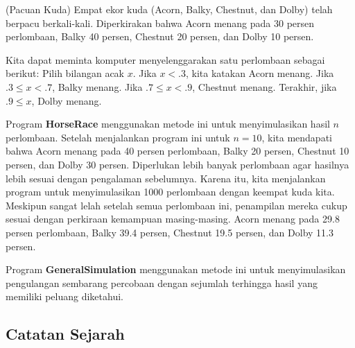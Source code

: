 \begin{example}(Pacuan Kuda)\label{exam 1.4}
Empat ekor kuda (Acorn, Balky, Chestnut, dan Dolby) telah berpacu berkali-kali.
Diperkirakan bahwa Acorn menang pada 30 persen perlombaan, Balky 40
persen, Chestnut 20 persen, dan Dolby 10 persen.
\par
Kita dapat meminta komputer menyelenggarakan satu perlombaan sebagai berikut:  
Pilih bilangan acak $x$.  Jika $x < .3$, kita katakan Acorn menang.  Jika $.3 \le x < .7$,
Balky menang.  Jika $.7 \le x < .9$, Chestnut menang.  Terakhir, jika $.9 \le x$,
Dolby menang. 
\par
Program {\bf HorseRace} menggunakan metode ini untuk menyimulasikan hasil
$n$ perlombaan.   Setelah menjalankan program ini untuk $n = 10$, kita mendapati bahwa Acorn menang pada 40 persen perlombaan,
Balky 20 persen, Chestnut 10 persen, dan Dolby 30 persen.  
Diperlukan lebih banyak perlombaan agar hasilnya lebih sesuai dengan pengalaman sebelumnya.
Karena itu, kita menjalankan program untuk menyimulasikan 1000 perlombaan dengan keempat kuda kita. 
Meskipun sangat lelah setelah semua perlombaan ini, penampilan mereka cukup sesuai
dengan perkiraan kemampuan masing-masing. Acorn menang pada 29.8 persen perlombaan,
Balky 39.4 persen, Chestnut 19.5 persen, dan Dolby 11.3 persen. 
\par
Program {\bf GeneralSimulation} menggunakan metode ini untuk menyimulasikan
pengulangan sembarang percobaan dengan sejumlah terhingga hasil yang memiliki
peluang diketahui.
\end{example}

\subsection*{Catatan Sejarah}

